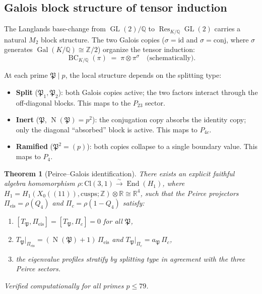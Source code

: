 \documentclass[11pt,a4paper]{article}
\theoremstyle{plain}
\newtheorem{theorem}{Theorem}[section]
\theoremstyle{definition}
\theoremstyle{remark}
\numberwithin{equation}{section}
\providecommand{\Cl}{\mathrm{Cl}}
\providecommand{\ZZ}{\mathbb{Z}}
\providecommand{\QQ}{\mathbb{Q}}
\providecommand{\RR}{\mathbb{R}}
\providecommand{\fP}{\mathfrak{P}}
\DeclareMathOperator{\End}{End}
\DeclareMathOperator{\Gal}{Gal}
\DeclareMathOperator{\Res}{Res}
\DeclareMathOperator{\BC}{BC}
\DeclareMathOperator{\Nm}{N}
\providecommand{\GL}{\operatorname{GL}}
\begin{document}
\subsection{Galois block structure of tensor induction}

The Langlands base-change from $\GL(2)/\QQ$ to $\Res_{K/\QQ}\GL(2)$ carries
a natural $M_2$ block structure.  The two Galois copies ($\sigma = \mathrm{id}$
and $\sigma = \mathrm{conj}$, where $\sigma$ generates
$\Gal(K/\QQ) \cong \ZZ/2$) organize the tensor induction:
\[
  \BC_{K/\QQ}(\pi) \;=\; \pi \otimes \pi^\sigma
  \quad\text{(schematically)}.
\]

At each prime $\fP \mid p$, the local structure depends on the splitting type:
\begin{itemize}
\item \textbf{Split} ($\fP_1, \fP_2$): both Galois copies active; the two
  factors interact through the off-diagonal blocks.  This maps to the
  $P_{23}$ sector.
\item \textbf{Inert} ($\fP$, $\Nm(\fP) = p^2$): the conjugation copy absorbs
  the identity copy; only the diagonal ``absorbed'' block is active.  This
  maps to $P_{4c}$.
\item \textbf{Ramified} ($\fP^2 = (p)$): both copies collapse to a single
  boundary value.  This maps to $P_4$.
\end{itemize}

\begin{theorem}[Peirce--Galois identification]\label{thm:main}
There exists an explicit faithful algebra homomorphism
$\rho: \Cl(3,1) \xrightarrow{\sim} \End(H_1)$, where
$H_1 = H_1(X_0((11)), \mathrm{cusps}; \ZZ) \otimes \RR \cong \RR^4$,
such that the Peirce projectors
$\Pi_{\mathrm{eis}} = \rho(Q_4)$ and $\Pi_c = \rho(1-Q_4)$ satisfy:
\begin{enumerate}[label=(\roman*)]
\item $[T_\fP, \Pi_{\mathrm{eis}}] = [T_\fP, \Pi_c] = 0$ for all $\fP$,
\item $T_\fP\big|_{\Pi_{\mathrm{eis}}} = (\Nm(\fP)+1)\,\Pi_{\mathrm{eis}}$
  and $T_\fP\big|_{\Pi_c} = a_\fP\,\Pi_c$,
\item the eigenvalue profiles stratify by splitting type in agreement with the
  three Peirce sectors.
\end{enumerate}
Verified computationally for all primes $p \leq 79$.
\end{theorem}


\end{document}
